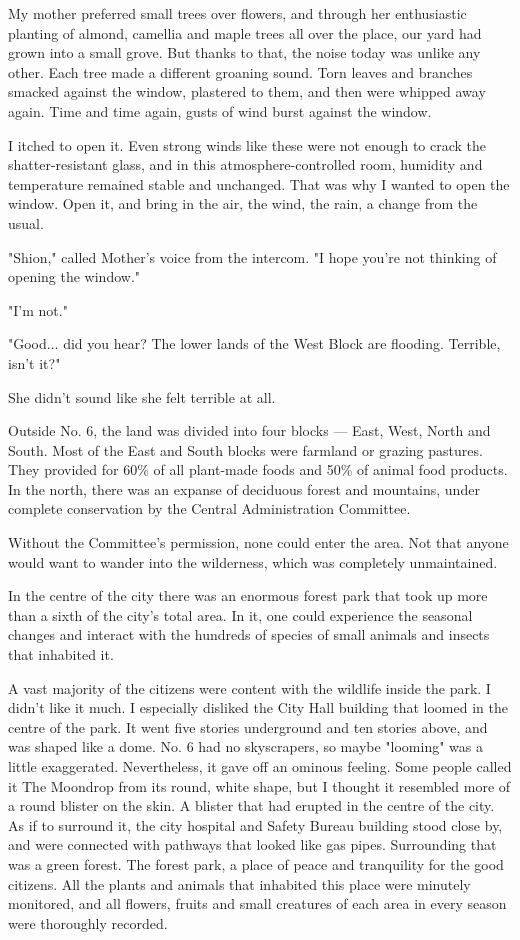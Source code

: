 My mother preferred small trees over flowers, and through her
enthusiastic planting of almond, camellia and maple trees all over the
place, our yard had grown into a small grove. But thanks to that, the
noise today was unlike any other. Each tree made a different groaning
sound. Torn leaves and branches smacked against the window, plastered to
them, and then were whipped away again. Time and time again, gusts of
wind burst against the window.

I itched to open it. Even strong winds like these were not enough to
crack the shatter-resistant glass, and in this atmosphere-controlled
room, humidity and temperature remained stable and unchanged. That was
why I wanted to open the window. Open it, and bring in the air, the
wind, the rain, a change from the usual.

"Shion," called Mother's voice from the intercom. "I hope you're not
thinking of opening the window."

"I'm not."

"Good... did you hear? The lower lands of the West Block are flooding.
Terrible, isn't it?"

She didn't sound like she felt terrible at all.

Outside No. 6, the land was divided into four blocks --- East, West, North
and South. Most of the East and South blocks were farmland or grazing
pastures. They provided for 60\% of all plant-made foods and 50\% of
animal food products. In the north, there was an expanse of deciduous
forest and mountains, under complete conservation by the Central
Administration Committee.

Without the Committee's permission, none could enter the area. Not that
anyone would want to wander into the wilderness, which was completely
unmaintained.

In the centre of the city there was an enormous forest park that took up
more than a sixth of the city's total area. In it, one could experience
the seasonal changes and interact with the hundreds of species of small
animals and insects that inhabited it.

A vast majority of the citizens were content with the wildlife inside
the park. I didn't like it much. I especially disliked the City Hall
building that loomed in the centre of the park. It went five stories
underground and ten stories above, and was shaped like a dome. No. 6 had
no skyscrapers, so maybe "looming" was a little exaggerated.
Nevertheless, it gave off an ominous feeling. Some people called it The
Moondrop from its round, white shape, but I thought it resembled more of
a round blister on the skin. A blister that had erupted in the centre of
the city. As if to surround it, the city hospital and Safety Bureau
building stood close by, and were connected with pathways that looked
like gas pipes. Surrounding that was a green forest. The forest park, a
place of peace and tranquility for the good citizens. All the plants and
animals that inhabited this place were minutely monitored, and all
flowers, fruits and small creatures of each area in every season were
thoroughly recorded.

